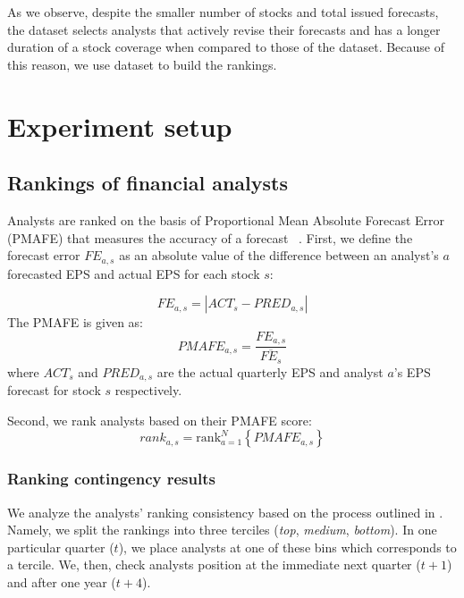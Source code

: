 \documentclass[12pt,a4paper]{article}\usepackage[]{graphicx}\usepackage[]{color}
\begin{document}
As we observe, despite the smaller number of stocks and total issued forecasts, the \filtered{} dataset selects analysts that actively revise their forecasts and has a longer duration of a stock coverage when compared to those of the \sample{} dataset. Because of this reason, we use \filtered{} dataset to build the rankings.

\section{Experiment setup}
\label{ch3-sec:exp_setup}
\subsection{Rankings of financial analysts}
\label{ch3:eps-rank}
Analysts are ranked on the basis of Proportional Mean Absolute Forecast Error (PMAFE) that measures the accuracy of a forecast ~\citep{clement1999,brown2001,ertimur2007}. First,  we define the forecast  error  $FE_{a,s}$ as an absolute value of the difference between an analyst's $a$ forecasted EPS  and actual EPS for each stock $s$:

\begin{equation}
FE_{a,s}=|{ACT_{s}-PRED_{a,s}}|
\end{equation}
The PMAFE is given as:
\begin{equation}
PMAFE_{a,s}= \frac{FE_{a,s}}{\overline{FE_{s}}}
\end{equation}
where $ACT_{s}$ and $PRED_{a,s}$ are the actual quarterly EPS and  analyst $a$'s EPS forecast for stock $s$ respectively.

Second, we rank analysts based on their PMAFE score:
\begin{equation}
\label{ch3-eps:rank}
rank_{a,s}=\mathrm{rank}_{a=1}^{N} \left\{ PMAFE_{a,s} \right\}
\end{equation}



\subsubsection{Ranking contingency results}
\label{ch3-tab:rank-contin}

We analyze the analysts' ranking consistency based on the process outlined in \cite{aiguzhinov2015a}.  Namely, we split the rankings into three terciles (\textit{top}, \textit{medium}, \textit{bottom}). In one particular quarter ($t$), we place  analysts at one of these bins which corresponds to a tercile. We, then,  check analysts position at the immediate next quarter ($t+1$) and after one year ($t+4$).
\end{document}
